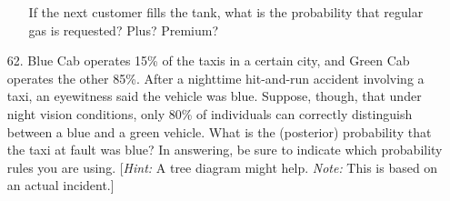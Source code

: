 \documentclass[letterpaper,12pt]{article}
\begin{document}
\begin{enumerate}
\begin{enumerate}
        If the next customer fills the tank, what is the probability that regular gas is requested? Plus? Premium?
    \end{enumerate}
  \item[62.]
    Blue Cab operates 15\% of the taxis in a certain city, and Green Cab operates the other 85\%. After a nighttime hit-and-run accident involving a taxi, an eyewitness said the vehicle was blue. Suppose, though, that under night vision conditions, only 80\% of individuals can correctly distinguish between a blue and a green vehicle. What is the (posterior) probability that the taxi at fault was blue? In answering, be sure to indicate which probability rules you are using. [\textit{Hint:} A tree diagram might help. \textit{Note:} This is based on an actual incident.]
\end{enumerate}
\end{document}
